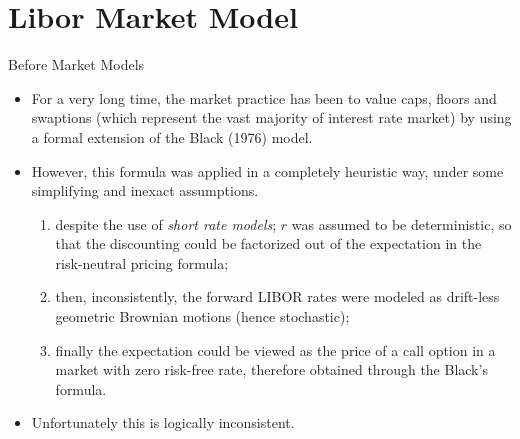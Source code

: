 \documentclass{beamer}
\begin{document}

\section{Libor Market Model}
\begin{frame}{Before Market Models}
  \begin{itemize}
  \item For a very long time, the market practice has been to value caps, floors and swaptions (which represent the vast majority of interest rate market) by using a formal extension of the Black (1976) model. 
  \item However, this formula was applied in a completely heuristic way, under some simplifying and inexact assumptions.
    \begin{enumerate}
    \item despite the use of \emph{short rate models}; $r$ was assumed to be deterministic, so that the discounting could be factorized out of the expectation in the risk-neutral pricing formula; 
    \item then, inconsistently, the forward LIBOR rates were modeled as drift-less geometric Brownian motions (hence stochastic);
    \item finally the expectation could be viewed as the price of a call option in a market with zero risk-free rate, therefore obtained through the Black’s formula.
    \end{enumerate} 
  \item Unfortunately this is logically inconsistent.
  \end{itemize}
\end{frame}
\end{document}
